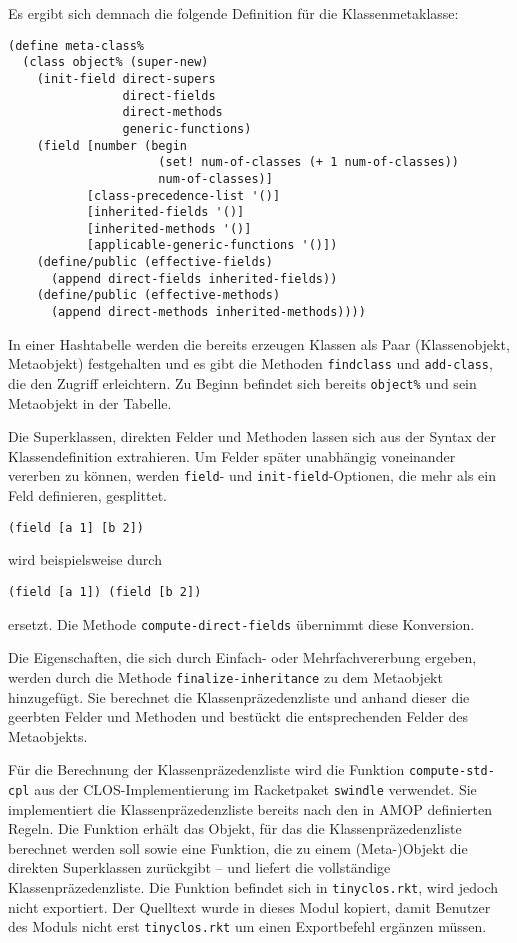 Es ergibt sich demnach die folgende Definition für die Klassenmetaklasse:

\begin{lstlisting}
(define meta-class%
  (class object% (super-new)
    (init-field direct-supers
                direct-fields
                direct-methods
                generic-functions)
    (field [number (begin 
                     (set! num-of-classes (+ 1 num-of-classes))
                     num-of-classes)]
           [class-precedence-list '()]
           [inherited-fields '()]
           [inherited-methods '()]
           [applicable-generic-functions '()])    
    (define/public (effective-fields)
      (append direct-fields inherited-fields))
    (define/public (effective-methods)
      (append direct-methods inherited-methods))))
\end{lstlisting}

In einer Hashtabelle werden die bereits erzeugen Klassen als Paar (Klassenobjekt, Metaobjekt) festgehalten und es gibt die Methoden \texttt{findclass} und \texttt{add-class}, die den Zugriff erleichtern. Zu Beginn befindet sich bereits \texttt{object\%} und sein Metaobjekt in der Tabelle.

Die Superklassen, direkten Felder und Methoden lassen sich aus der Syntax der Klassendefinition extrahieren. Um Felder später unabhängig voneinander vererben zu können, werden \texttt{field}- und \texttt{init-field}-Optionen, die mehr als ein Feld definieren, gesplittet. 

\texttt{(field [a 1] [b 2])} 

wird beispielsweise durch

\texttt{(field [a 1]) (field [b 2])}

ersetzt. Die Methode \texttt{compute-direct-fields} übernimmt diese Konversion.

Die Eigenschaften, die sich durch Einfach- oder Mehrfachvererbung ergeben, werden durch die Methode \texttt{finalize-inheritance} zu dem Metaobjekt hinzugefügt. Sie berechnet die Klassenpräzedenzliste und anhand dieser die geerbten Felder und Methoden und bestückt die entsprechenden Felder des Metaobjekts.

Für die Berechnung der Klassenpräzedenzliste wird die Funktion \texttt{compute-std-cpl} aus der CLOS-Implementierung im Racketpaket \texttt{swindle} verwendet. Sie implementiert die Klassenpräzedenzliste bereits nach den in AMOP definierten Regeln. Die Funktion erhält das Objekt, für das die Klassenpräzedenzliste berechnet werden soll  sowie eine Funktion, die zu einem (Meta-)Objekt die direkten Superklassen zurückgibt -- und liefert die vollständige Klassenpräzedenzliste. Die Funktion befindet sich in \texttt{tinyclos.rkt}, wird jedoch nicht exportiert. Der Quelltext wurde in dieses Modul kopiert, damit Benutzer des Moduls nicht erst \texttt{tinyclos.rkt} um einen Exportbefehl ergänzen müssen. 

